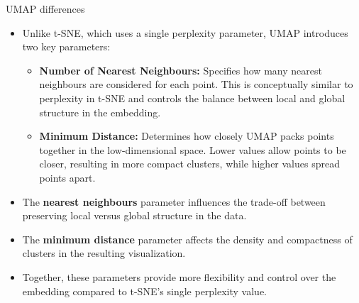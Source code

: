 \begin{frame}[allowframebreaks]{UMAP differences}
    \begin{itemize}
        \item Unlike t-SNE, which uses a single perplexity parameter, UMAP introduces two key parameters:
        \begin{itemize}
            \item \textbf{Number of Nearest Neighbours:} Specifies how many nearest neighbours are considered for each point. This is conceptually similar to perplexity in t-SNE and controls the balance between local and global structure in the embedding.
            \item \textbf{Minimum Distance:} Determines how closely UMAP packs points together in the low-dimensional space. Lower values allow points to be closer, resulting in more compact clusters, while higher values spread points apart.
        \end{itemize}
        \item The \textbf{nearest neighbours} parameter influences the trade-off between preserving local versus global structure in the data.
        \item The \textbf{minimum distance} parameter affects the density and compactness of clusters in the resulting visualization.
        \item Together, these parameters provide more flexibility and control over the embedding compared to t-SNE's single perplexity value.
    \end{itemize}

    \framebreak


\end{frame}
